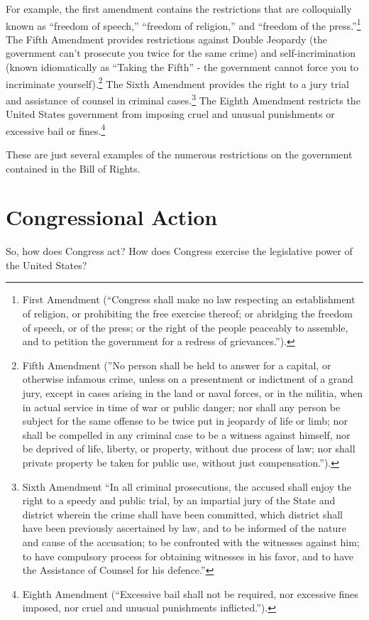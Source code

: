 For example, the first amendment contains the restrictions that are colloquially known as ``freedom of speech,'' ``freedom of religion,'' and ``freedom of the press.''\footnote{First Amendment (``Congress shall make no law respecting an establishment of religion, or prohibiting the free exercise thereof; or abridging the freedom of speech, or of the press; or the right of the people peaceably to assemble, and to petition the government for a redress of grievances.'').}
The Fifth Amendment provides restrictions against Double Jeopardy (the government can't prosecute you twice for the same crime) and self-incrimination (known idiomatically as ``Taking the Fifth'' - the government cannot force you to incriminate yourself).\footnote{Fifth Amendment (''No person shall be held to answer for a capital, or otherwise infamous crime, unless on a presentment or indictment of a grand jury, except in cases arising in the land or naval forces, or in the militia, when in actual service in time of war or public danger; nor shall any person be subject for the same offense to be twice put in jeopardy of life or limb; nor shall be compelled in any criminal case to be a witness against himself, nor be deprived of life, liberty, or property, without due process of law; nor shall private property be taken for public use, without just compensation.'').}
The Sixth Amendment provides the right to a jury trial and assistance of counsel in criminal cases.\footnote{Sixth Amendment {``In all criminal prosecutions, the accused shall enjoy the right to a speedy and public trial, by an impartial jury of the State and district wherein the crime shall have been committed, which district shall have been previously ascertained by law, and to be informed of the nature and cause of the accusation; to be confronted with the witnesses against him; to have compulsory process for obtaining witnesses in his favor, and to have the Assistance of Counsel for his defence.''}}
The Eighth Amendment restricts the United States government from imposing cruel and unusual punishments or excessive bail or fines.\footnote{Eighth Amendment (``Excessive bail shall not be required, nor excessive fines imposed, nor cruel and unusual punishments inflicted.'').}

These are just several examples of the numerous restrictions on the government contained in the Bill of Rights.

\section{Congressional Action}
So, how does Congress act?  How does Congress exercise the legislative power of the United States?

